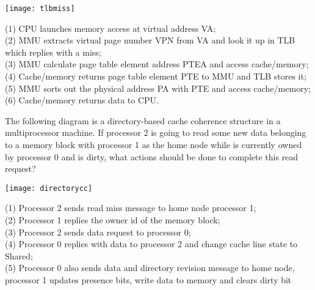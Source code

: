 \documentclass[a4paper, 12pt, addpoints]{exam}
\begin{document}
\begin{questions}
\centering \texttt{[image: tlbmiss]}

\begin{solution} 
\newpage

(1) CPU launches memory access at virtual address VA;  \\
(2) MMU extracts virtual page number VPN from VA and look it up in TLB which replies with a miss;   \\
(3) MMU calculate page table element address PTEA and access cache/memory; \\
(4) Cache/memory returns page table element PTE to MMU and TLB stores it; \\
(5) MMU sorts out the physical address PA with PTE and access cache/memory;  \\
(6) Cache/memory returns data to CPU.    \\
\end{solution} 
\newpage


\raggedright

\question[10]
The following diagram is a directory-based cache coherence structure in a multiprocessor machine. If processor 2 is going to read some new data belonging to a memory block with processor 1 as the home node while is currently owned by processor 0 and is dirty, what actions should be done to complete this read request?

\centering \texttt{[image: directorycc]}

\begin{solution} 
\newpage

(1) Processor 2 sends read miss message to home node processor 1;  \\
(2) Processor 1 replies the owner id of the memory block;   \\
(3) Processor 2 sends data request to processor 0; \\
(4) Processor 0 replies with data to processor 2 and change cache line state to Shared; \\
(5) Processor 0 also sends data and directory revision message to home node, processor 1 updates presence bits, write data to memory and clears dirty bit  \\
\end{solution} 
\newpage




\end{questions}
\end{document}
